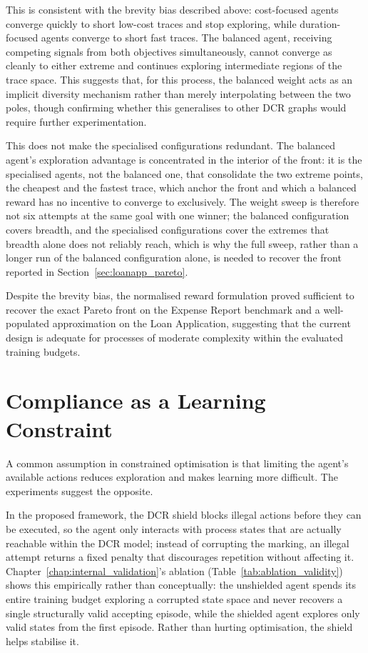This is consistent with the brevity bias described above: cost-focused agents converge quickly to short low-cost traces and stop exploring, while duration-focused agents converge to short fast traces. The balanced agent, receiving competing signals from both objectives simultaneously, cannot converge as cleanly to either extreme and continues exploring intermediate regions of the trace space. This suggests that, for this process, the balanced weight acts as an implicit diversity mechanism rather than merely interpolating between the two poles, though confirming whether this generalises to other \ac{DCR} graphs would require further experimentation.

This does not make the specialised configurations redundant. The balanced agent's exploration advantage is concentrated in the interior of the front: it is the specialised agents, not the balanced one, that consolidate the two extreme points, the cheapest and the fastest trace, which anchor the front and which a balanced reward has no incentive to converge to exclusively. The weight sweep is therefore not six attempts at the same goal with one winner; the balanced configuration covers breadth, and the specialised configurations cover the extremes that breadth alone does not reliably reach, which is why the full sweep, rather than a longer run of the balanced configuration alone, is needed to recover the front reported in Section~\ref{sec:loanapp_pareto}.

Despite the brevity bias, the normalised reward formulation proved sufficient to recover the exact Pareto front on the Expense Report benchmark and a well-populated approximation on the Loan Application, suggesting that the current design is adequate for processes of moderate complexity within the evaluated training budgets.

\section{Compliance as a Learning Constraint}
\label{sec:discussion_compliance}

A common assumption in constrained optimisation is that limiting the agent's available actions reduces exploration and makes learning more difficult. The experiments suggest the opposite.

In the proposed framework, the \ac{DCR} shield blocks illegal actions before they can be executed, so the agent only interacts with process states that are actually reachable within the \ac{DCR} model; instead of corrupting the marking, an illegal attempt returns a fixed penalty that discourages repetition without affecting it. Chapter~\ref{chap:internal_validation}'s ablation (Table~\ref{tab:ablation_validity}) shows this empirically rather than conceptually: the unshielded agent spends its entire training budget exploring a corrupted state space and never recovers a single structurally valid accepting episode, while the shielded agent explores only valid states from the first episode. Rather than hurting optimisation, the shield helps stabilise it.

